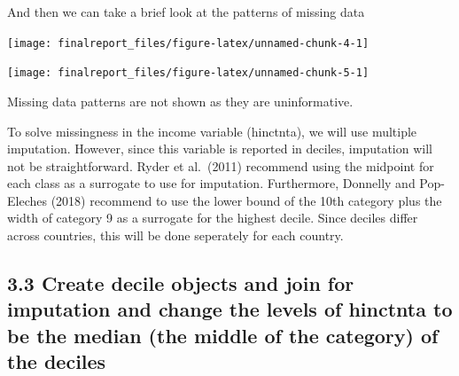 \documentclass[
]{article}
\begin{document}
And then we can take a brief look at the patterns of missing data

\texttt{[image: finalreport\_files/figure-latex/unnamed-chunk-4-1]}

\texttt{[image: finalreport\_files/figure-latex/unnamed-chunk-5-1]}

Missing data patterns are not shown as they are uninformative.

To solve missingness in the income variable (hinctnta), we will use
multiple imputation. However, since this variable is reported in
deciles, imputation will not be straightforward. Ryder et al.~(2011)
recommend using the midpoint for each class as a surrogate to use for
imputation. Furthermore, Donnelly and Pop-Eleches (2018) recommend to
use the lower bound of the 10th category plus the width of category 9 as
a surrogate for the highest decile. Since deciles differ across
countries, this will be done seperately for each country.

\hypertarget{create-decile-objects-and-join-for-imputation-and-change-the-levels-of-hinctnta-to-be-the-median-the-middle-of-the-category-of-the-deciles}{%
\subsection{3.3 Create decile objects and join for imputation and change
the levels of hinctnta to be the median (the middle of the category) of
the
deciles}\label{create-decile-objects-and-join-for-imputation-and-change-the-levels-of-hinctnta-to-be-the-median-the-middle-of-the-category-of-the-deciles}}
\end{document}
